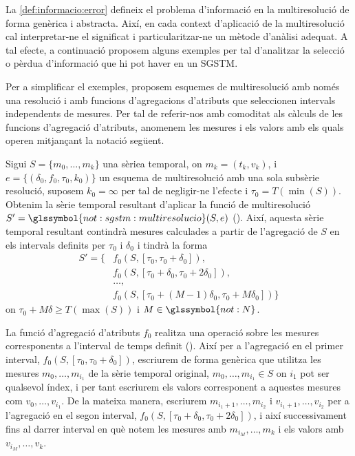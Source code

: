 La \autoref{def:informacio:error} defineix el problema d'informació en
la multiresolució de forma genèrica i abstracta. Així, en cada context
d'aplicació de la multiresolució cal interpretar-ne el significat i
particularitzar-ne un mètode d'anàlisi adequat.  A tal efecte, a
continuació proposem alguns exemples per tal d'analitzar la selecció o
pèrdua d'informació que hi pot haver en un \gls{SGSTM}.  


Per a simplificar el exemples, proposem esquemes de multiresolució amb
només una resolució i amb funcions d'agregacions d'atributs que
seleccionen intervals independents de mesures. Per tal de referir-nos
amb comoditat als càlculs de les funcions d'agregació d'atributs,
anomenem les mesures i els valors amb els quals operen mitjançant la
notació següent.

\begin{definition}
  \label{def:informacio:notaciovalors}
  Sigui $S=\{m_0,\dotsc,m_k\}$ una sèriea temporal, on
  $m_k=(t_k,v_k)$, i $e= \{ (\delta_0, f_0, \tau_0, k_0) \}$ un
  esquema de multiresolució amb una sola subsèrie resolució, suposem
  $k_0=\infty$ per tal de negligir-ne l'efecte i
  $\tau_0=T(\min(S))$. Obtenim la sèrie temporal resultant d'aplicar
  la funció de multiresolució
  $S'=\glssymbol{not:sgstm:multiresolucio}(S,e)$
  ().  Així, aquesta sèrie temporal
  resultant contindrà mesures calculades a partir de l'agregació de
  $S$ en els intervals definits per $\tau_0$ i $\delta_0$ i tindrà la
  forma
  \begin{align*}
    S'=  \{ & f_0(S,[\tau_0,\tau_0+\delta_0]), \\
    & f_0(S,[\tau_0+\delta_0,\tau_0+2\delta_0]),\\
    &\dotsc, \\
    & f_0(S,[\tau_0+(M-1)\delta_0,\tau_0+M\delta_0])\}
  \end{align*}
  on $\tau_0+M\delta\geq T(\max(S))$ i $M\in\glssymbol{not:N}$.

  La funció d'agregació d'atributs $f_0$ realitza una operació sobre
  les mesures corresponents a l'interval de temps definit
  ().  Així per a l'agregació en el primer
  interval, $f_0(S,[\tau_0,\tau_0+\delta_0])$, escriurem de forma
  genèrica que utilitza les mesures $m_0,\dotsc,m_{i_1}$ de la sèrie
  temporal original, $m_0,\dotsc,m_{i_1} \in S$ on $i_1$ pot ser
  qualsevol índex, i per tant escriurem els valors corresponent a
  aquestes mesures com $v_0,\dotsc,v_{i_1}$. De la mateixa manera,
  escriurem $m_{i_1+1},\dotsc,m_{i_2}$ i $v_{i_1+1},\dotsc,v_{i_2}$
  per a l'agregació en el segon interval,
  $f_0(S,[\tau_0+\delta_0,\tau_0+2\delta_0])$, i així successivament
  fins al darrer interval en què notem les mesures amb $m_{i_M},
  \dotsc, m_k$ i els valors amb $v_{i_M}, \dotsc, v_k$.



\end{definition}
